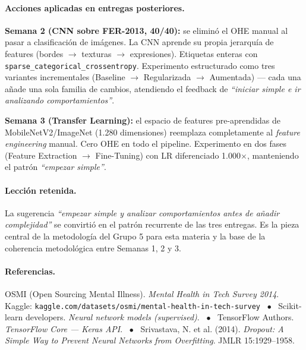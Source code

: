 \documentclass[10pt,a4paper,twocolumn]{article}
\begin{document}
\paragraph{Acciones aplicadas en entregas posteriores.}

\textbf{Semana 2 (CNN sobre FER-2013, 40/40):} se eliminó el OHE manual al pasar a clasificación de imágenes. La CNN aprende su propia jerarquía de features (bordes $\rightarrow$ texturas $\rightarrow$ expresiones). Etiquetas enteras con \texttt{sparse\_categorical\_crossentropy}. Experimento estructurado como tres variantes incrementales (Baseline $\rightarrow$ Regularizada $\rightarrow$ Aumentada) — cada una añade una sola familia de cambios, atendiendo el feedback de \textit{``iniciar simple e ir analizando comportamientos''}.

\textbf{Semana 3 (Transfer Learning):} el espacio de features pre-aprendidas de MobileNetV2/ImageNet (1.280 dimensiones) reemplaza completamente al \textit{feature engineering} manual. Cero OHE en todo el pipeline. Experimento en dos fases (Feature Extraction $\rightarrow$ Fine-Tuning) con LR diferenciado 1.000$\times$, manteniendo el patrón \textit{``empezar simple''}.

\paragraph{Lección retenida.} La sugerencia \textit{``empezar simple y analizar comportamientos antes de añadir complejidad''} se convirtió en el patrón recurrente de las tres entregas. Es la pieza central de la metodología del Grupo 5 para esta materia y la base de la coherencia metodológica entre Semanas 1, 2 y 3.

\paragraph{Referencias.}
{\footnotesize
OSMI (Open Sourcing Mental Illness). \textit{Mental Health in Tech Survey 2014}. Kaggle: \texttt{kaggle.com/datasets/osmi/mental-health-in-tech-survey} ~$\bullet$~
Scikit-learn developers. \textit{Neural network models (supervised)}. ~$\bullet$~
TensorFlow Authors. \textit{TensorFlow Core --- Keras API}. ~$\bullet$~
Srivastava, N. et al. (2014). \textit{Dropout: A Simple Way to Prevent Neural Networks from Overfitting}. JMLR 15:1929--1958.
}
\end{document}
